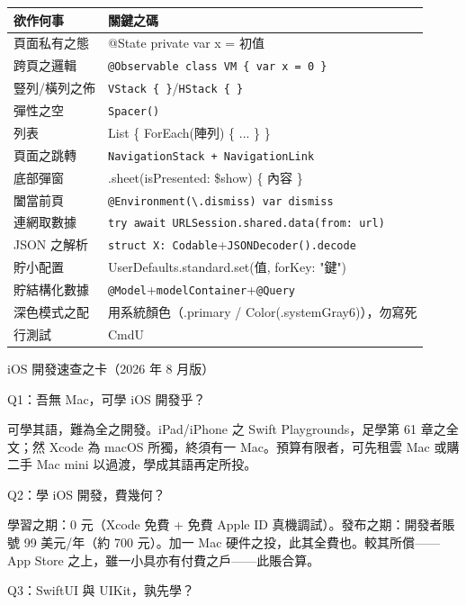 


\begin{center}
\begin{tabularx}{\linewidth}{|X|X|}
\hline
\textbf{欲作何事} & \textbf{關鍵之碼} \tabularnewline
\hline
頁面私有之態 & @State private var x = 初值 \tabularnewline
跨頁之邏輯 & \texttt{@Observable class VM \{ var x = 0 \}} \tabularnewline
豎列/橫列之佈 & \texttt{VStack \{ \}}/\texttt{HStack \{ \}} \tabularnewline
彈性之空 & \texttt{Spacer()} \tabularnewline
列表 & List \{ ForEach(陣列) \{ ... \} \} \tabularnewline
頁面之跳轉 & \texttt{NavigationStack + NavigationLink} \tabularnewline
底部彈窗 & .sheet(isPresented: \$show) \{ 內容 \} \tabularnewline
闔當前頁 & \texttt{@Environment(\textbackslash{}.\allowbreak dismiss) var dismiss} \tabularnewline
連網取數據 & \texttt{try await URLSession.\allowbreak shared.\allowbreak data(from: url)} \tabularnewline
JSON 之解析 & \texttt{struct X: Codable}+\texttt{JSONDecoder().\allowbreak decode} \tabularnewline
貯小配置 & UserDefaults.standard.set(值, forKey: "鍵") \tabularnewline
貯結構化數據 & \texttt{@Model}+\texttt{modelContainer}+\texttt{@Query} \tabularnewline
深色模式之配 & 用系統顏色（.primary / Color(.systemGray6)），勿寫死 \tabularnewline
行測試 & CmdU \tabularnewline
\hline
\end{tabularx}
\end{center}

\begin{center}\small\color{gray}iOS 開發速查之卡（2026 年 8 月版）\end{center}


Q1：吾無 Mac，可學 iOS 開發乎？

可學其語，難為全之開發。iPad/iPhone 之 Swift Playgrounds，足學第 61 章之全文；然 Xcode 為 macOS 所獨，終須有一 Mac。預算有限者，可先租雲 Mac 或購二手 Mac mini 以過渡，學成其語再定所投。

Q2：學 iOS 開發，費幾何？

學習之期：0 元（Xcode 免費 + 免費 Apple ID 真機調試）。發布之期：開發者賬號 99 美元/年（約 700 元）。加一 Mac 硬件之投，此其全費也。較其所償——App Store 之上，雖一小具亦有付費之戶——此賬合算。

Q3：SwiftUI 與 UIKit，孰先學？

